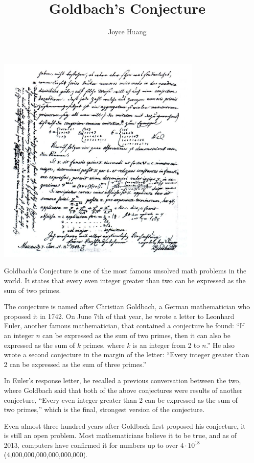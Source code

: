 \documentclass{article}
\title{Goldbach's Conjecture}
\author{Joyce Huang}
\begin{document}
\maketitle

\begin{center}
    \includegraphics[width=4in]{images/goldbach-conjecture.jpg}
\end{center}

Goldbach’s Conjecture is one of the most famous unsolved math problems in the world. It states that every even integer greater than two can be expressed as the sum of two primes. 

The conjecture is named after Christian Goldbach, a German mathematician who proposed it in 1742. On June 7th of that year, he wrote a letter to Leonhard Euler, another famous mathematician, that contained a conjecture he found: ``If an integer $n$ can be expressed as the sum of two primes, then it can also be expressed as the sum of $k$ primes, where $k$ is an integer from 2 to $n$.'' He also wrote a second conjecture in the margin of the letter: ``Every integer greater than 2 can be expressed as the sum of three primes.'' 

In Euler’s response letter, he recalled a previous conversation between the two, where Goldbach said that both of the above conjectures were results of another conjecture, ``Every even integer greater than 2 can be expressed as the sum of two primes,'' which is the final, strongest version of the conjecture.  

Even almost three hundred years after Goldbach first proposed his conjecture, it is still an open problem. Most mathematicians believe it to be true, and as of 2013, computers have confirmed it for numbers up to over $4\cdot10^{18}$ (4,000,000,000,000,000,000). 
\end{document}
